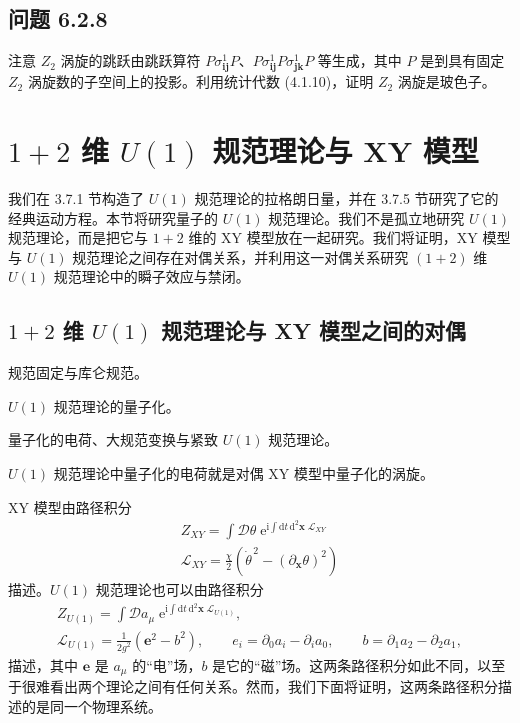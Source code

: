 \subsection*{问题 6.2.8}

注意 $Z_2$ 涡旋的跳跃由跳跃算符 $P\sigma^1_{\pmb{ij}}P$、$P\sigma^1_{\pmb{ij}}P\sigma^1_{\pmb{jk}}P$ 等生成，其中 $P$ 是到具有固定 $Z_2$ 涡旋数的子空间上的投影。利用统计代数 (4.1.10)，证明 $Z_2$ 涡旋是玻色子。

\section{$1+2$ 维 $U(1)$ 规范理论与 XY 模型}

我们在 3.7.1 节构造了 $U(1)$ 规范理论的拉格朗日量，并在 3.7.5 节研究了它的经典运动方程。本节将研究量子的 $U(1)$ 规范理论。我们不是孤立地研究 $U(1)$ 规范理论，而是把它与 $1+2$ 维的 XY 模型放在一起研究。我们将证明，XY 模型与 $U(1)$ 规范理论之间存在对偶关系，并利用这一对偶关系研究 $(1+2)$ 维 $U(1)$ 规范理论中的瞬子效应与禁闭。

\subsection{$1+2$ 维 $U(1)$ 规范理论与 XY 模型之间的对偶}

\begin{keypoints}
\item 规范固定与库仑规范。
\item $U(1)$ 规范理论的量子化。
\item 量子化的电荷、大规范变换与紧致 $U(1)$ 规范理论。
\item $U(1)$ 规范理论中量子化的电荷就是对偶 XY 模型中量子化的涡旋。
\end{keypoints}

XY 模型由路径积分
\begin{gather*}
Z_{XY} = \int \mathcal{D}\theta\; \mathrm{e}^{\mathrm{i}\int \mathrm{d}t\,\mathrm{d}^2\pmb{x}\; \mathcal{L}_{XY}}\\
\mathcal{L}_{XY} = \frac{\chi}{2}\left(\dot{\theta}^{\,2} - (\partial_{\pmb{x}}\theta)^2\right)\tag{6.3.1}
\end{gather*}
描述。$U(1)$ 规范理论也可以由路径积分
\begin{gather*}
Z_{U(1)} = \int \mathcal{D}a_\mu\; \mathrm{e}^{\mathrm{i}\int \mathrm{d}t\,\mathrm{d}^2\pmb{x}\; \mathcal{L}_{U(1)}},\tag{6.3.2}\\
\mathcal{L}_{U(1)} = \frac{1}{2g^2}\left(\pmb{e}^2 - b^2\right), \qquad e_i = \partial_0 a_i - \partial_i a_0, \qquad b = \partial_1 a_2 - \partial_2 a_1,
\end{gather*}
描述，其中 $\pmb{e}$ 是 $a_\mu$ 的“电”场，$b$ 是它的“磁”场。这两条路径积分如此不同，以至于很难看出两个理论之间有任何关系。然而，我们下面将证明，这两条路径积分描述的是同一个物理系统。

